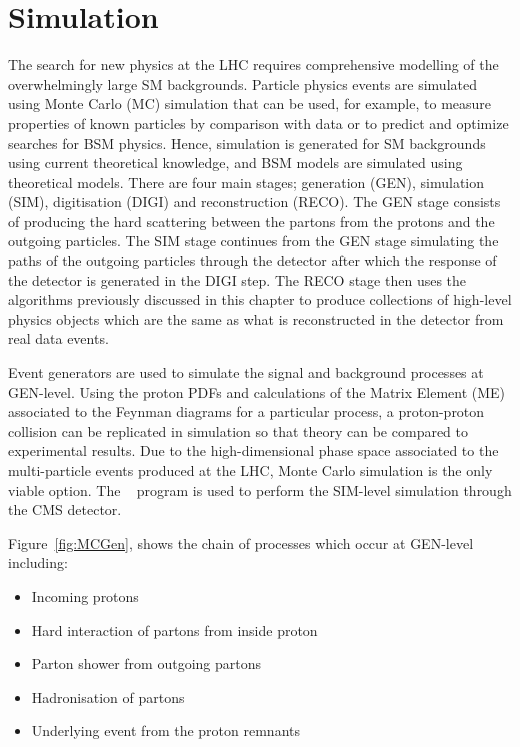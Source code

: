 
\chapter{Simulation}
The search for new physics at the LHC requires comprehensive modelling of the overwhelmingly large SM backgrounds. Particle physics events are simulated using Monte Carlo (MC) simulation that can be used, for example, to measure properties of known particles by comparison with data or to predict and optimize searches for BSM physics. Hence, simulation is generated for SM backgrounds using current theoretical knowledge, and BSM models are simulated using theoretical models.
There are four main stages; generation (GEN), simulation (SIM), digitisation (DIGI) and reconstruction (RECO). The GEN stage consists of producing the hard scattering between the partons from the protons and the outgoing particles. The SIM stage continues from the GEN stage simulating the paths of the outgoing particles through the detector after which the response of the detector is generated in the DIGI step. The RECO stage then uses the algorithms previously discussed in this chapter to produce collections of high-level physics objects which are the same as what is reconstructed in the detector from real data events.



Event generators are used to simulate the signal and background processes at GEN-level. Using the proton PDFs and calculations of the Matrix Element (ME) associated to the Feynman diagrams for a particular process, a proton-proton collision can be replicated in simulation so that theory can be compared to experimental results. Due to the high-dimensional phase space associated to the multi-particle events produced at the LHC, Monte Carlo simulation is the only viable option. The \GEANTfour~\cite{GEANT4} program is used to perform the SIM-level simulation through the CMS detector. 

Figure~\ref{fig:MCGen}, shows the chain of processes which occur at GEN-level including:
\begin{itemize}
\item Incoming protons
\item Hard interaction of partons from inside proton
\item Parton shower from outgoing partons
\item Hadronisation of partons
\item Underlying event from the proton remnants 
\end{itemize}

